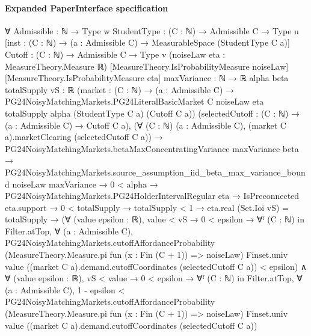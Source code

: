\documentclass[10pt]{article}
\begin{document}
\paragraph{Expanded PaperInterface specification}
\begin{ReviewVerbatim}
∀ {Admissible : ℕ → Type w} {StudentType : (C : ℕ) → Admissible C → Type u}
  [inst : (C : ℕ) → (a : Admissible C) → MeasurableSpace (StudentType C a)] {Cutoff : (C : ℕ) → Admissible C → Type v}
  (noiseLaw eta : MeasureTheory.Measure ℝ) [MeasureTheory.IsProbabilityMeasure noiseLaw]
  [MeasureTheory.IsProbabilityMeasure eta] {maxVariance : ℕ → ℝ} {alpha beta totalSupply vS : ℝ}
  (market :
    (C : ℕ) →
      (a : Admissible C) →
        PG24NoisyMatchingMarkets.PG24LiteralBasicMarket C noiseLaw eta totalSupply alpha (StudentType C a) (Cutoff C a))
  (selectedCutoff : (C : ℕ) → (a : Admissible C) → Cutoff C a),
  (∀ (C : ℕ) (a : Admissible C), (market C a).marketClearing (selectedCutoff C a)) →
    PG24NoisyMatchingMarkets.betaMaxConcentratingVariance maxVariance beta →
      PG24NoisyMatchingMarkets.source_assumption_iid_beta_max_variance_bound noiseLaw maxVariance →
        0 < alpha →
          PG24NoisyMatchingMarkets.PG24HolderIntervalRegular eta →
            IsPreconnected eta.support →
              0 < totalSupply →
                totalSupply < 1 →
                  eta.real (Set.Ioi vS) = totalSupply →
                    (∀ (value epsilon : ℝ),
                        value < vS →
                          0 < epsilon →
                            ∀ᶠ (C : ℕ) in Filter.atTop,
                              ∀ (a : Admissible C),
                                PG24NoisyMatchingMarkets.cutoffAffordanceProbability
                                    (MeasureTheory.Measure.pi fun (x : Fin (C + 1)) => noiseLaw) Finset.univ value
                                    ((market C a).demand.cutoffCoordinates (selectedCutoff C a)) <
                                  epsilon) ∧
                      ∀ (value epsilon : ℝ),
                        vS < value →
                          0 < epsilon →
                            ∀ᶠ (C : ℕ) in Filter.atTop,
                              ∀ (a : Admissible C),
                                1 - epsilon <
                                  PG24NoisyMatchingMarkets.cutoffAffordanceProbability
                                    (MeasureTheory.Measure.pi fun (x : Fin (C + 1)) => noiseLaw) Finset.univ value
                                    ((market C a).demand.cutoffCoordinates (selectedCutoff C a))
\end{ReviewVerbatim}
\end{document}

